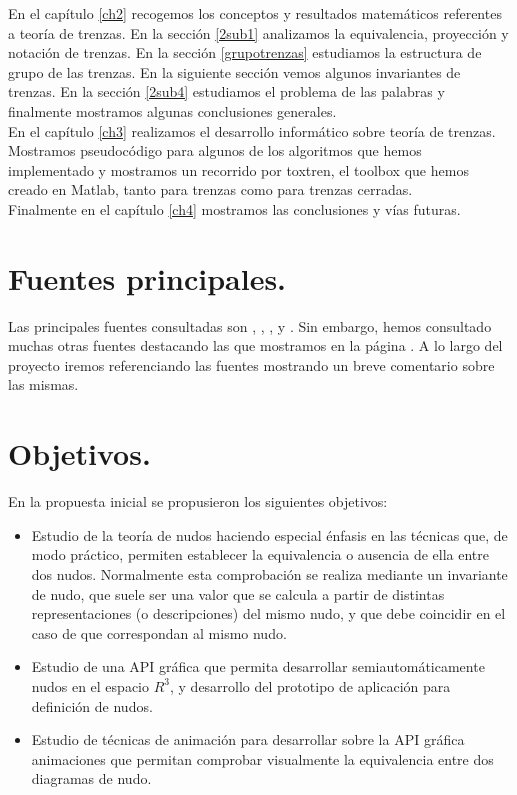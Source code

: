 En el capítulo \ref{ch2} recogemos los conceptos y resultados matemáticos referentes a teoría de trenzas. En la sección \ref{2sub1} analizamos la equivalencia, proyección y notación de trenzas. En la sección \ref{grupotrenzas} estudiamos la estructura de grupo de las trenzas. En la siguiente sección vemos algunos invariantes de trenzas. En la sección \ref{2sub4} estudiamos el problema de las palabras y finalmente mostramos algunas conclusiones generales. \\

En el capítulo \ref{ch3} realizamos el desarrollo informático sobre teoría de trenzas. Mostramos pseudocódigo para algunos de los algoritmos que hemos implementado y mostramos un recorrido por toxtren, el toolbox que hemos creado en Matlab, tanto para trenzas como para trenzas cerradas. \\

Finalmente en el capítulo \ref{ch4} mostramos las conclusiones y vías futuras. 

\section{Fuentes principales.}
Las principales fuentes consultadas son \cite{1}, \cite{2}, \cite{3}, \cite{4} y \cite{5}. Sin embargo, hemos consultado muchas otras fuentes destacando las que mostramos en la página \pageref{bibliog}. A lo largo del proyecto iremos referenciando las fuentes mostrando un breve comentario sobre las mismas. 

\section{Objetivos.}

En la propuesta inicial se propusieron los siguientes objetivos:
\begin{itemize}
	\item Estudio de la teoría de nudos haciendo especial énfasis en las técnicas que, de modo práctico, permiten establecer la equivalencia o ausencia de ella entre dos nudos. Normalmente esta comprobación se realiza mediante un invariante de nudo, que suele ser una valor que se calcula a partir de distintas representaciones (o descripciones) del mismo nudo, y que debe coincidir en el caso de que correspondan al mismo nudo.
	
	\item Estudio de una API gráfica que permita desarrollar semiautomáticamente nudos en el espacio $ R^{3} $, y desarrollo del prototipo de aplicación para definición de nudos.
	
	\item Estudio de técnicas de animación para desarrollar sobre la API gráfica animaciones que permitan comprobar visualmente la equivalencia entre dos diagramas de nudo.
\end{itemize}

